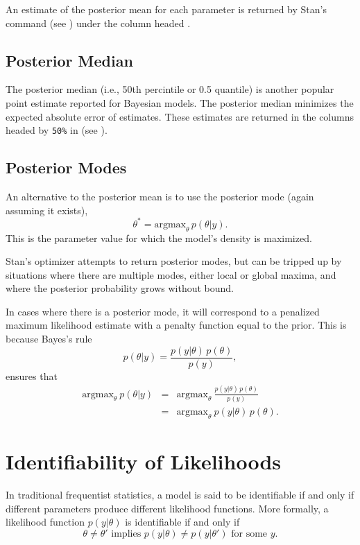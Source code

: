 An estimate of the posterior mean for each parameter is returned by Stan's
 command (see ) under the
column headed .

\subsection{Posterior Median}

The posterior median (i.e., 50th percintile or 0.5 quantile) is
another popular point estimate reported for Bayesian models.  The
posterior median minimizes the expected absolute error of estimates.
These estimates are returned in the columns headed by \Verb|50%
in  (see ).

\subsection{Posterior Modes}

An alternative to the posterior mean is to use the posterior mode
(again assuming it exists),
%
\[
\theta^{*} = \mbox{argmax}_{\theta} \, p(\theta|y).
\]
%
This is the parameter value for which the model's density is
maximized.

Stan's optimizer attempts to return posterior modes, but can be
tripped up by situations where there are multiple modes, either local
or global maxima, and where the posterior probability grows without
bound.

In cases where there is a posterior mode, it will correspond to a
penalized maximum likelihood estimate with a penalty function equal to
the prior.  This is because Bayes's rule
\[
p(\theta|y) = \frac{p(y|\theta) \, p(\theta)}{p(y)},
\]
ensures that
%
\begin{eqnarray*}
\mbox{argmax}_{\theta} \ p(\theta|y)
& = &
\mbox{argmax}_{\theta} \ \frac{p(y|\theta) \, p(\theta)}{p(y)}
\\[6pt]
& = &
\mbox{argmax}_{\theta} \ p(y|\theta) \, p(\theta).
\end{eqnarray*}

\section{Identifiability of Likelihoods}

In traditional frequentist statistics, a model is said to be
identifiable if and only if different parameters produce different
likelihood functions. More formally, a likelihood function
$p(y|\theta)$ is identifiable if and only if
%
\[
\theta \neq \theta'
\mbox{ implies } 
p(y|\theta) \neq p(y|\theta') \mbox{ for some } y.
\]
%

